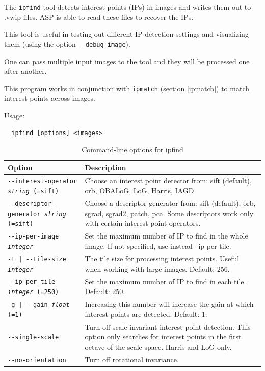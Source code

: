 The \texttt{ipfind} tool detects interest points (IPs) in images and writes them out to .vwip files.
ASP is able to read these files to recover the IPs.  

This tool is useful in testing out different IP detection settings and visualizing them (using the option \texttt{-\/-debug-image}).

One can pass multiple input images to the tool and they will be processed one after another.

This program works in conjunction with \texttt{ipmatch} (section \ref{ipmatch}) to match interest points across images.

Usage:
\begin{verbatim}
  ipfind [options] <images>
\end{verbatim}

\begin{longtable}{|l|p{9.5cm}|}
\caption{Command-line options for ipfind}
\label{tbl:ipfind}
\endfirsthead
\endhead
\endfoot
\endlastfoot
\hline
Option & Description \\ \hline \hline
\texttt{-\/-interest-operator \textit{string} (=sift) } & Choose an interest point detector from: sift (default), orb, OBALoG, LoG, Harris, IAGD.\\ \hline
\texttt{-\/-descriptor-generator \textit{string} (=sift) } & Choose a descriptor generator from: sift (default), orb, sgrad, sgrad2, patch, pca. Some descriptors work only with certain interest point operators.\\ \hline
\texttt{-\/-ip-per-image \textit{integer}} & Set the maximum number of IP to find in the whole image. If not specified, use instead --ip-per-tile.\\ \hline
\texttt{-t | -\/-tile-size  \textit{integer} } & The tile size for processing interest points. Useful when working with large images. Default: 256.\\ \hline
\texttt{-\/-ip-per-tile \textit{integer} (=250) } & Set the maximum number of IP to find in each tile. Default: 250.\\ \hline
\texttt{-g | -\/-gain  \textit{float} (=1) } & Increasing this number will increase the gain at which interest points are detected. Default: 1.\\ \hline
\texttt{-\/-single-scale  } & Turn off scale-invariant interest point detection. This option only searches for interest points in the first octave of the scale space. Harris and LoG only.\\ \hline
\texttt{-\/-no-orientation  } & Turn off rotational invariance.\\ \hline

\end{longtable}
